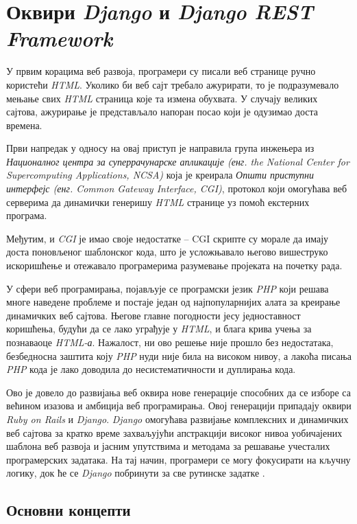 \documentclass[12pt,oneside]{memoir}
\begin{document}
\chapter{Оквири \textit{Django} и \textit{Django REST Framework}}\label{chapter:django-theory}

У првим корацима веб развоја, програмери су писали веб странице ручно користећи \textit{HTML}. Уколико би веб сајт требало ажурирати,
то је подразумевало мењање свих \textit{HTML} страница које та измена обухвата. У случају великих сајтова, ажурирање је представљало 
напоран посао који је одузимао доста времена.

Први напредак у односу на овај приступ је направила група инжењера из \textit{Националног центра за суперрачунарске апликације 
(енг. the National Center for Supercomputing Applications, NCSA)} која је креирала \textit{Општи приступни интерфејс 
(енг. Common Gateway Interface, CGI)}, протокол који омогућава веб серверима да динамички генеришу \textit{HTML} странице уз помоћ екстерних програма. 

Међутим, и \textit{CGI} је имао своје недостатке -- CGI скрипте су морале да имају доста поновљеног шаблонског кода, што је усложњавало његово вишеструко искоришћење и отежавало програмерима разумевање пројеката на почетку рада.

У сфери веб програмирања, појављује се програмски језик \textit{PHP} који решава многе наведене проблеме и постаје један од најпопуларнијих алата за креирање динамичких веб сајтова. Његове главне погодности јесу једноставност коришћења, будући да се лако уграђује у \textit{HTML}, и блага крива учења за познаваоце \textit{HTML-а}. Нажалост, ни ово решење није прошло без недостатака, безбедносна заштита коју \textit{PHP} нуди није била на високом нивоу, а лакоћа писања \textit{PHP} кода је лако доводила до несистематичности и дуплирања кода.

Ово је довело до развијања веб оквира нове генерације способних да се изборе са 
већином изазова и амбиција веб програмирања. Овој генерацији припадају оквири \textit{Ruby
on Rails} и \textit{Django}. \textit{Django} омогућава развијање комплексних и динамичких веб сајтова за кратко време захваљујући апстракцији високог нивоа уобичајених шаблона веб развоја и јасним упутствима и методама за решавање учесталих програмерских задатака. На тај начин, програмери се могу фокусирати на кључну логику, док ће се \textit{Django} побринути за све рутинске задатке \cite{GuideToDjango}.

\section{Основни концепти}
\end{document}
